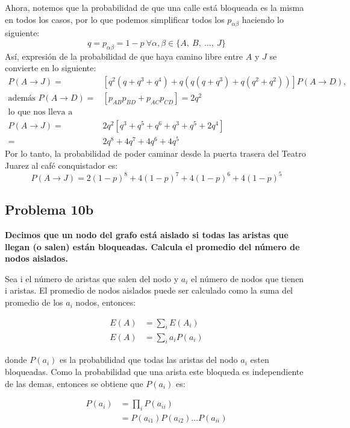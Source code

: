 Ahora, notemos que la probabilidad de que una calle está bloqueada es la misma en todos los casos, por lo que podemos simplificar todos los $p_{\alpha\beta}$ haciendo lo siguiente:
$$
    q = p_{\alpha\beta}=1-p\ \forall\alpha, \beta\in\{A,\ B,\ ...,\ J\}
$$
Así, expresión de la probabilidad de que haya camino libre entre $A$ y $J$ se convierte en lo siguiente:
\begin{align*}
    P(A\rightarrow J) =                & \left[ q^2(q+q^3+q^4) +q(q(q+q^3)+q(q^2+q^2))\right]P(A\rightarrow D), \\
    \text{además } P(A\rightarrow D) = & \left[p_{AB}p_{BD}+p_{AC}p_{CD}\right] = 2q^2                          \\
    \text{lo que nos lleva a }         &                                                                        \\
    P(A\rightarrow J) =                & 2q^2\left[ q^3+q^5 + q^6 + q^3+ q^5+ 2q^4\right]                       \\
    =                                  & 2q^8+4q^7+4q^6+4q^5
\end{align*}
Por lo tanto, la probabilidad de poder caminar desde la puerta trasera del Teatro Juarez al café conquistador es:
$$
    P(A\rightarrow J) = 2(1-p)^8+4(1-p)^7+4(1-p)^6+4(1-p)^5
$$
\subsection*{Problema 10b}
\textbf{Decimos que un nodo del grafo está aislado si todas las aristas que llegan (o salen) están bloqueadas. Calcula el promedio del número de nodos aislados.}

Sea i el número de aristas que salen del nodo y $a_i$ el número de nodos que tienen i aristas. El promedio de nodos aislados puede ser calculado como la suma del promedio de los $a_i$ nodos, entonces:

\begin{align}
    E(A) & = \sum_i E(A_i)     \nonumber     \\
    E(A) & = \sum_i a_i P(a_i) \label{eq:ea}
\end{align}

donde $P(a_i)$ es la probabilidad que todas las aristas del nodo $a_i$ esten bloqueadas. Como la probabilidad que una arista este bloqueda es independiente de las demas, entonces se obtiene que $P(a_i)$ es:

\begin{align*}
    P(a_i) & = \prod_i P(a_{ii})                \\
           & =P(a_{i1})P(a_{i2})\dots P(a_{ii})
\end{align*}

